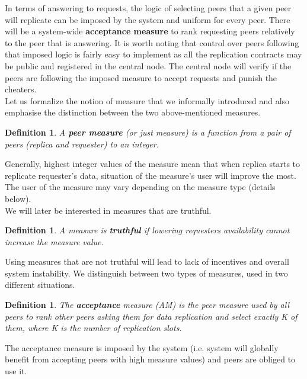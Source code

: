 \documentclass{pracamgren}
\newcounter{collective_ctr} \numberwithin{collective_ctr}{chapter}
\newtheorem{definition}[collective_ctr]{Definition}
\begin{document}
In terms of answering to requests, the logic of selecting peers that a given peer will replicate can be imposed by the system and uniform for every peer. There will be a system-wide {\bf acceptance measure} to rank requesting peers relatively to the peer that is answering. It is worth noting that control over peers following that imposed logic is fairly easy to implement as all the replication contracts may be public and registered in the central node. The central node will verify if the peers are following the imposed measure to accept requests and punish the cheaters.\\

Let us formalize the notion of measure that we informally introduced and also emphasise the distinction between the two above-mentioned measures.

\begin{definition}
A {\bf peer measure} (or just measure) is a function from a pair of peers (replica and requester) to an integer.
\end{definition}

Generally, highest integer values of the measure mean that when replica starts to replicate requester's data, situation of the measure's user will improve the most. The user of the measure may vary depending on the measure type (details below).\\

We will later be interested in measures that are truthful.

\begin{definition}
A measure is {\bf truthful} if lowering requesters availability cannot increase the measure value.
\end{definition}

Using measures that are not truthful will lead to lack of incentives and overall system instability. We distinguish between two types of measures, used in two different situations.\\

\begin{definition}
The {\bf acceptance} measure (AM) is the peer measure used by all peers to rank other peers asking them for data replication and select exactly K of them, where K is the number of replication slots.
\end{definition}

The acceptance measure is imposed by the system (i.e. system will globally benefit from accepting peers with high measure values) and peers are obliged to use it.\\
\end{document}
